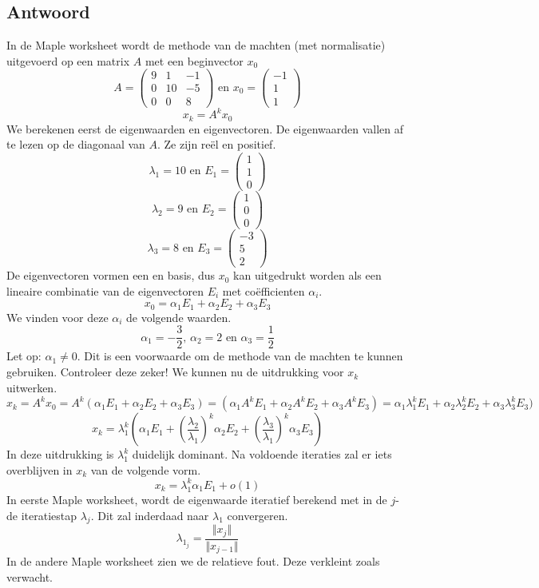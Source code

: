 \documentclass[examenvragen.tex]{subfiles}
\begin{document}
\subsection{Antwoord}
In de Maple worksheet wordt de methode van de machten (met normalisatie) uitgevoerd op een matrix $A$ met een beginvector $x_0$
\[
A=
\begin{pmatrix}
9 & 1 & -1\\
0 & 10 & -5\\
0 & 0 & 8
\end{pmatrix}
\text{ en }
x_0 = \begin{pmatrix}
-1\\1\\1
\end{pmatrix}
\]
\[
x_{k} = A^{k}x_{0} 
\]
We berekenen eerst de eigenwaarden en eigenvectoren. De eigenwaarden vallen af te lezen op de diagonaal van $A$. Ze zijn re\"el en positief.
\[
\lambda_{1} = 10 \text{ en } E_{1} = \begin{pmatrix}1\\1\\0\end{pmatrix} 
\]
\[
\lambda_{2} = 9 \text{ en } E_{2} = \begin{pmatrix}1\\0\\0\end{pmatrix} 
\]
\[
\lambda_{3} = 8 \text{ en } E_{3} = \begin{pmatrix}-3\\5\\2\end{pmatrix} 
\]
De eigenvectoren vormen een en basis, dus $x_0$ kan uitgedrukt worden als een lineaire combinatie van de eigenvectoren $E_i$ met co\"efficienten $\alpha_i$.
\[
x_{0} = \alpha_{1}E_1 + \alpha_2E_2 + \alpha_{3}E_3
\]
We vinden voor deze $\alpha_i$ de volgende waarden.
\[
\alpha_1 = -\frac{3}{2} \text{, } \alpha_{2} = 2 \text{ en } \alpha_{3} = \frac{1}{2}
\]
Let op: $\alpha_1 \neq 0$. Dit is een voorwaarde om de methode van de machten te kunnen gebruiken. Controleer deze zeker!
We kunnen nu de uitdrukking voor $x_{k}$ uitwerken.
\[
x_{k} = A^{k}x_{0} = A^{k}(\alpha_{1}E_1 + \alpha_2E_2 + \alpha_{3}E_3) = (\alpha_{1}A^{k}E_1 + \alpha_2A^{k}E_2 + \alpha_{3}A^{k}E_3)
= \alpha_{1}\lambda_1^{k}E_1 + \alpha_2\lambda_2^{k}E_2 + \alpha_{3}\lambda_3^{k}E_3)
\]
\[
x_{k} = \lambda_{1}^{k}\left(\alpha_1E_1 + \left(\frac{\lambda_2}{\lambda_1}\right)^{k}\alpha_2E_2 + \left(\frac{\lambda_3}{\lambda_1}\right)^{k}\alpha_3E_3\right)
\]
In deze uitdrukking is $\lambda_{1}^{k}$ duidelijk dominant. Na voldoende iteraties zal er iets overblijven in $x_k$ van de volgende vorm.
\[
x_{k} = \lambda_{1}^{k}\alpha_1E_1 + o(1)
\]
In eerste Maple worksheet, wordt de eigenwaarde iteratief berekend met in de $j$-de iteratiestap $\lambda_{j}$. Dit zal inderdaad naar $\lambda_{1}$ convergeren.
\[
\lambda_{1_{j}} = \frac{\Vert x_{j}\Vert }{\Vert x_{j-1}\Vert}
\]
In de andere Maple worksheet zien we de relatieve fout. Deze verkleint zoals verwacht.
\end{document}
